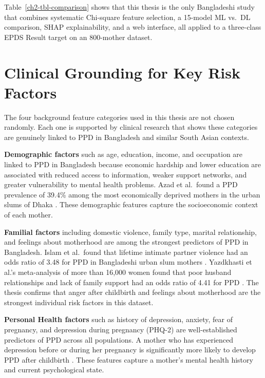 Table~\ref{ch2-tbl-comparison} shows that this thesis is the only Bangladeshi study that combines systematic Chi-square feature selection, a 15-model ML vs.\ DL comparison, SHAP explainability, and a web interface, all applied to a three-class EPDS Result target on an 800-mother dataset.

\section{Clinical Grounding for Key Risk Factors}
\label{ch2-sec-clinical-grounding}

The four background feature categories used in this thesis are not chosen randomly. Each one is supported by clinical research that shows these categories are genuinely linked to PPD in Bangladesh and similar South Asian contexts.

\textbf{Demographic factors} such as age, education, income, and occupation are linked to PPD in Bangladesh because economic hardship and lower education are associated with reduced access to information, weaker support networks, and greater vulnerability to mental health problems. Azad et al.\ found a PPD prevalence of 39.4\% among the most economically deprived mothers in the urban slums of Dhaka \cite{azad2019economic}. These demographic features capture the socioeconomic context of each mother.

\textbf{Familial factors} including domestic violence, family type, marital relationship, and feelings about motherhood are among the strongest predictors of PPD in Bangladesh. Islam et al.\ found that lifetime intimate partner violence had an odds ratio of 3.48 for PPD in Bangladeshi urban slum mothers \cite{islam2017ipv}. Yazdkhasti et al.'s meta-analysis of more than 16,000 women found that poor husband relationships and lack of family support had an odds ratio of 4.41 for PPD \cite{yazdkhasti2026systematic}. The thesis confirms that anger after childbirth and feelings about motherhood are the strongest individual risk factors in this dataset.

\textbf{Personal Health factors} such as history of depression, anxiety, fear of pregnancy, and depression during pregnancy (PHQ-2) are well-established predictors of PPD across all populations. A mother who has experienced depression before or during her pregnancy is significantly more likely to develop PPD after childbirth \cite{yazdkhasti2026systematic}. These features capture a mother's mental health history and current psychological state.

